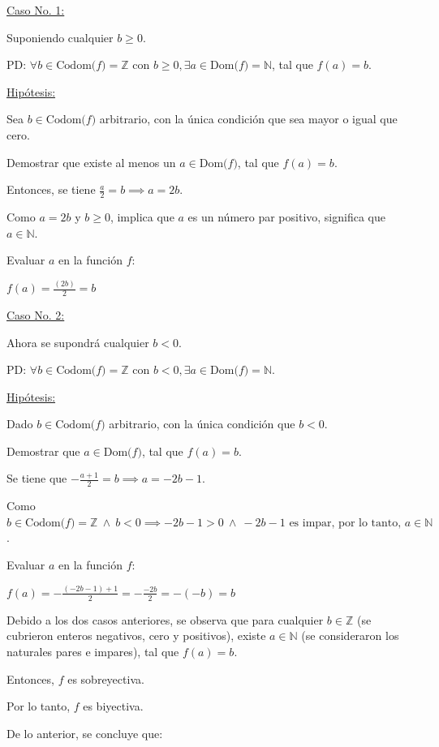 \documentclass{article}
\begin{document}
\underline{Caso No. 1:} 

Suponiendo cualquier $b \ge 0$.

PD: $\forall b \in \text{Codom($f$)} = \mathbb{Z} \text{ con } b \ge 0, \exists a \in \text{Dom($f$)} = \mathbb{N}$, tal que $f(a) = b$.

\underline{Hipótesis:}

Sea $b \in \text{Codom($f$)}$ arbitrario, con la única condición que sea mayor o igual que cero.

Demostrar que existe al menos un $a \in \text{Dom($f$)}$, tal que $f(a) = b$.

Entonces, se tiene $\displaystyle \frac{a}{2} = b \implies a = 2b$.

Como $a = 2b$ y $b \ge 0$, implica que $a$ es un número par positivo, significa que $a \in \mathbb{N}$.

Evaluar $a$ en la función $f$:

$\displaystyle f(a) = \frac{(2b)}{2} = b$

\underline{Caso No. 2:} 

Ahora se supondrá cualquier $b < 0$.

PD: $\forall b \in \text{Codom($f$)} = \mathbb{Z} \text{ con } b < 0, \exists a \in \text{Dom($f$)} = \mathbb{N}$.

\underline{Hipótesis:}

Dado $b \in \text{Codom($f$)}$ arbitrario, con la única condición que $b < 0$.

Demostrar que $a \in \text{Dom($f$)}$, tal que $f(a) = b$.

Se tiene que $\displaystyle -\frac{a + 1}{2} = b \implies a = -2b - 1$.

Como $b \in \text{Codom($f$)} = \mathbb{Z} \ \land \ b < 0 \implies - 2b - 1 > 0 \ \land \ -2b - 1 \text{ es impar, por lo tanto, } a \in \mathbb{N}$.

Evaluar $a$ en la función $f$:

$\displaystyle f(a) = -\frac{(-2b - 1) + 1}{2} = -\frac{-2b}{2} = -(-b) = b$

Debido a los dos casos anteriores, se observa que para cualquier $b \in \mathbb{Z}$ (se cubrieron enteros negativos, cero y positivos), existe $a \in \mathbb{N}$ (se consideraron los naturales pares e impares), tal que $f(a) = b$.

Entonces, $f$ es sobreyectiva.

Por lo tanto, $f$ es biyectiva.

De lo anterior, se concluye que:
\end{document}
